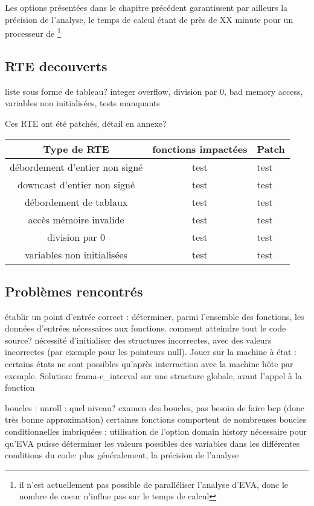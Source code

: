 Les options présentées dans le chapitre précédent garantissent par ailleurs la précision de l'analyse, le temps de calcul étant de près de XX minute pour un processeur de    \footnote{il n'est actuellement pas possible de paralléliser l'analyse d'EVA, donc le nombre de coeur n'influe pas sur le temps de calcul}

\subsection{RTE decouverts}

liste sous forme de tableau? integer overflow, division par 0, bad memory access, variables non initialisées, tests manquants

Ces RTE ont été patchés, détail en annexe?

\begin{tabular}{|c|c|l}
	\hline
Type de RTE & fonctions impactées & Patch \\
	\hline
débordement d'entier non signé & test & test \\
	\hline\hline
downcast d'entier non signé & test & test \\
	\hline
débordement de tablaux & test & test \\
	\hline
accès mémoire invalide & test & test \\
	\hline
division par 0 & test & test \\
	\hline
variables non initialisées & test & test \\
\end{tabular}


\subsection{Problèmes rencontrés}

établir un point d'entrée correct : déterminer, parmi l'ensemble des fonctions, les données d'entrées nécessaires aux fonctions.
comment atteindre tout le code source? nécessité d'initialiser des structures incorrectes, avec des valeurs incorrectes (par exemple pour les pointeurs null).
Jouer sur la machine à état : certains états ne sont possibles qu'après interraction avec la machine hôte par exemple. Solution: frama-c\_interval sur une structure globale, avant l'appel à la fonction

boucles : unroll : quel niveau? examen des boucles, pas besoin de faire bcp (donc très bonne approximation)
certaines fonctions comportent de nombreuses boucles conditionnelles imbriquées : utilisation de l'option domain history nécessaire pour qu'EVA puisse déterminer les valeurs possibles des variables dans les différentes conditions du code: plus généralement, la précision de l'analyse

